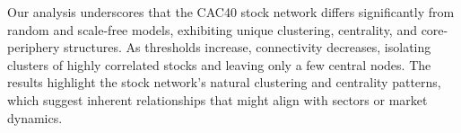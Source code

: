 \documentclass[12pt]{article}
\begin{document}
Our analysis underscores that the CAC40 stock network differs significantly from random and scale-free models, exhibiting unique clustering, centrality, and core-periphery structures. As thresholds increase, connectivity decreases, isolating clusters of highly correlated stocks and leaving only a few central nodes. The results highlight the stock network’s natural clustering and centrality patterns, which suggest inherent relationships that might align with sectors or market dynamics.

%
%
\end{document}
